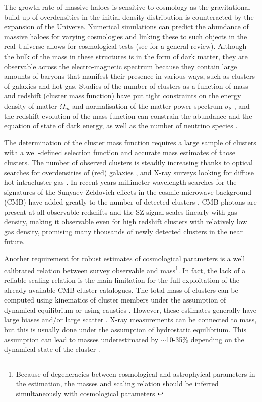 \documentclass[useAMS,usenatbib]{mnras}
\begin{document}
The growth rate of massive haloes is sensitive to cosmology as the gravitational build-up of overdensities in the initial density distribution is counteracted by the expansion of the Universe. Numerical simulations can predict the abundance of massive haloes for varying cosmologies and linking these to such objects in the real Universe allows for cosmological tests (see \citealt{allen11} for a general review). Although the bulk of the mass in these structures is in the form of dark matter, they are observable across the electro-magnetic spectrum because they contain large amounts of baryons that manifest their presence in various ways, such as clusters of galaxies and hot gas.
Studies of the number of clusters as a function of mass and redshift (cluster mass function) have put tight constraints on the energy density of matter $\Omega_m$ and normalisation of the matter power spectrum $\sigma_8$ \citep[e.g.][]{borgani01, vikhlinin09b,rozo10}, and the redshift evolution of the mass function can constrain the abundance and the equation of state of dark energy, as well as the number of neutrino species \citep[e.g.][]{mantz10b, mantz15, planckclustercosmo16, dehaan16, bocquet19}. 

The determination of the cluster mass function requires a large sample of clusters with a well-defined selection function and accurate mass estimates of those clusters. The number of observed clusters is steadily increasing thanks to optical searches for overdensities of (red) galaxies \citep[e.g.][]{gladders05, rykoff16}, and X-ray surveys looking for diffuse hot intracluster gas \citep[e.g.][]{ebeling98,ebeling01,bohringer04, vikhlinin09a}. In recent years millimeter wavelength searches for the signatures of the Sunyaev-Zeldovich effects \mbox{\citep[SZ effect]{sz72}} in the cosmic microwave background (CMB) have added greatly to the number of detected clusters  \citep{planckSZclusters16,hilton18, bleem19}. CMB photons are present at all observable redshifts and the SZ signal scales linearly with gas density, making it observable even for high redshift clusters with relatively low gas density, promising many thousands of newly detected clusters in the near future.

Another requirement for robust estimates of cosmological parameters is a well calibrated relation between survey observable and mass\footnote{Because of degeneracies between cosmological and astrophyical parameters in the estimation, the masses and scaling relation should be inferred simultaneously with cosmological parameters \citep[e.g.][]{mantz10}}. In fact, the lack of a reliable scaling relation is the main limitation for the full exploitation of the already available CMB cluster catalogues. The total mass of clusters can be computed using kinematics of cluster members under the assumption of dynamical equilibrium \citep[e.g.][]{sifon16, amodeo17, armitage18} or using caustics \citep{rines16}. However, these estimates generally have large biases and/or large scatter \citep{old18}. X-ray measurements can be connected to mass, but this is usually done under the assumption of hydrostatic equilibrium. This assumption can lead to masses underestimated by $\sim$10-35\% depending on the dynamical state of the cluster \citep[e.g.][]{ henson17, barnes17}.
\end{document}
